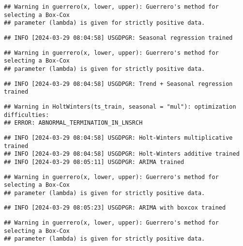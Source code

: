 \documentclass[
]{article}
\begin{document}
\begin{verbatim}
## Warning in guerrero(x, lower, upper): Guerrero's method for selecting a Box-Cox
## parameter (lambda) is given for strictly positive data.
\end{verbatim}

\begin{verbatim}
## INFO [2024-03-29 08:04:58] USGDPGR: Seasonal regression trained
\end{verbatim}

\begin{verbatim}
## Warning in guerrero(x, lower, upper): Guerrero's method for selecting a Box-Cox
## parameter (lambda) is given for strictly positive data.
\end{verbatim}

\begin{verbatim}
## INFO [2024-03-29 08:04:58] USGDPGR: Trend + Seasonal regression trained
\end{verbatim}

\begin{verbatim}
## Warning in HoltWinters(ts_train, seasonal = "mul"): optimization difficulties:
## ERROR: ABNORMAL_TERMINATION_IN_LNSRCH
\end{verbatim}

\begin{verbatim}
## INFO [2024-03-29 08:04:58] USGDPGR: Holt-Winters multiplicative trained
## INFO [2024-03-29 08:04:58] USGDPGR: Holt-Winters additive trained
## INFO [2024-03-29 08:05:11] USGDPGR: ARIMA trained
\end{verbatim}

\begin{verbatim}
## Warning in guerrero(x, lower, upper): Guerrero's method for selecting a Box-Cox
## parameter (lambda) is given for strictly positive data.
\end{verbatim}

\begin{verbatim}
## INFO [2024-03-29 08:05:23] USGDPGR: ARIMA with boxcox trained
\end{verbatim}

\begin{verbatim}
## Warning in guerrero(x, lower, upper): Guerrero's method for selecting a Box-Cox
## parameter (lambda) is given for strictly positive data.
\end{verbatim}
\end{document}

